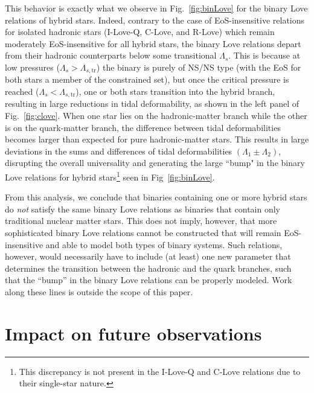 \documentclass[prd,twocolumn,nofootinbib,superscriptaddress,amsmath,amssymb]{revtex4-1}
\begin{document}
This behavior is exactly what we observe in Fig.~\ref{fig:binLove} for the binary Love relations of hybrid stars. Indeed, contrary to the case of EoS-insensitive relations for isolated hadronic stars (I-Love-Q, C-Love, and R-Love) which remain moderately EoS-insensitive for all hybrid stars, the binary Love relations depart from their hadronic counterparts below some transitional $\Lambda_{s}$. This is because at low pressures ($\Lambda_s>\Lambda_{s,\textrm{tr}}$) the binary is purely of NS/NS type (with the EoS for both stars a member of the constrained set), but once the critical pressure is reached ($\Lambda_{s}<\Lambda_{s,\textrm{tr}}$), one or both stars transition into the hybrid branch, resulting in large reductions in tidal deformability, as shown in the left panel of Fig.~\ref{fig:clove}. When one star lies on the hadronic-matter branch while the other is on the quark-matter branch, the difference between tidal deformabilities becomes larger than expected for pure hadronic-matter stars. This results in large deviations in the sums and differences of tidal deformabilities $(\Lambda_1 \pm \Lambda_2)$, disrupting the overall universality and generating the large ``bump" in the binary Love relations for hybrid stars\footnote{This discrepancy is not present in the I-Love-Q and C-Love relations due to their single-star nature.} seen in Fig~\ref{fig:binLove}.

From this analysis, we conclude that binaries containing one or more hybrid stars do \emph{not} satisfy the same binary Love relations as binaries that contain only traditional nuclear matter stars. This does not imply, however, that more sophisticated binary Love relations cannot be constructed that will remain EoS-insensitive and able to model both types of binary systems. Such relations, however, would necessarily have to include (at least) one new parameter that determines the transition between the hadronic and the quark branches, such that the ``bump'' in the binary Love relations can be properly modeled. Work along these lines is outside the scope of this paper. 



\section{Impact on future observations}
\label{sec:observations}
\end{document}

